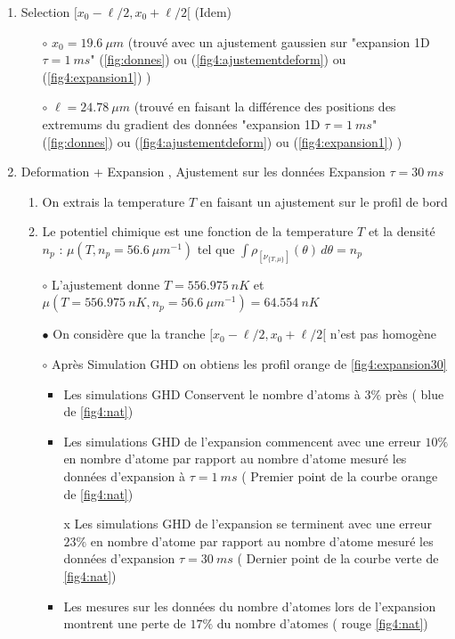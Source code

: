 \documentclass[a3, 10pt,twoside]{article}          %
\theoremstyle{plain}
\theoremstyle{definition}
\theoremstyle{remark}
\theoremstyle{definition} %
\def\OliveGreen{OliveGreen}
\begin{document}
			\begin{enumerate}[label =\Alph*)]
			
				
				\item Selection $[ x_0 - \ell/2 , x_0 + \ell/2[$ (Idem)
					\begin{itemize}
								\item[$\circ$] $x_0 = 19.6 ~\mu m $ (trouvé avec un ajustement gaussien sur {\color{OliveGreen}"expansion 1D $\tau =1~ms$" (\ref{fig:donnes})} ou {\color{orange} (\ref{fig4:ajustementdeform}) } ou {\color{blue}(\ref{fig4:expansion1})} ) 
								\item[$\circ$] $\ell = 24.78 ~ \mu m $ (trouvé en faisant la différence des positions des extremums du gradient des données {\color{OliveGreen}"expansion 1D $\tau =1~ms$" (\ref{fig:donnes})} ou {\color{orange} (\ref{fig4:ajustementdeform}) } ou {\color{blue}(\ref{fig4:expansion1})} )
							\end{itemize}
				

				\item Deformation + Expansion , Ajustement sur les données Expansion $\tau = 30 ~ms$ 
					\begin{enumerate}[label =\alph*)]

	
						\item On extrais la temperature $T$ en faisant un ajustement sur le profil de bord 
						\item Le potentiel chimique est une fonction de la temperature $T$ et la densité $n_p$ : $\mu( T , n_p = 56.6 ~{\mu m}^{-1} )$ tel que $\int \rho_{ [ \nu_{\{T,\mu\}} ] } (\theta) \, d \theta  = n_p $ 
						\item[$\circ$] L'ajustement donne $T = 556.975 ~nK$ et $\mu( T=556.975 ~nK , n_p = 56.6 ~{\mu m}^{-1} ) = 64.554~nK $ 

								\item[$\bullet$]	 On considère que la tranche $[ x_0 - \ell/2 , x_0 + \ell/2[$ n'est pas homogène 
								\item[$\circ$] Après Simulation GHD on obtiens les profil {\color{orange} orange de \ref{fig4:expansion30}}  
									\begin{itemize}
										\item Les simulations GHD Conservent le nombre d'atoms à $3\%$ près ({\color{blue} blue de \ref{fig4:nat}})
										\item Les simulations GHD de l'expansion commencent avec une erreur $10\%$ en nombre d'atome par rapport au nombre d'atome mesuré les données d'expansion à $\tau = 1~ms$ ({\color{orange} Premier point de la courbe orange de \ref{fig4:nat}}) 
										\item[x] Les simulations GHD de l'expansion se terminent avec une erreur $23\%$ en nombre d'atome par rapport au nombre d'atome mesuré les données d'expansion $\tau = 30~ms$ ({\color{\OliveGreen} Dernier point de la courbe verte de \ref{fig4:nat}})
										\item Les mesures sur les données du nombre d'atomes lors de l'expansion montrent une perte de $17\%$ du nombre d'atomes ({\color{red} rouge \ref{fig4:nat}})
									\end{itemize}	 	



\end{enumerate}
\end{enumerate}
\end{document}
